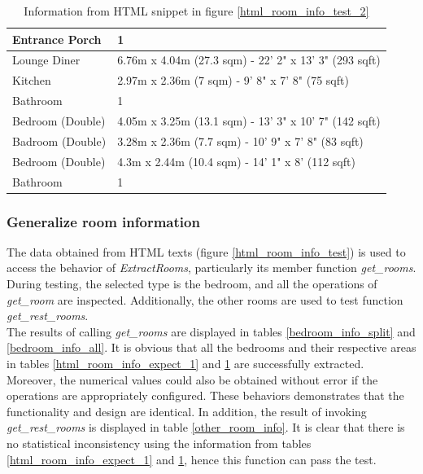 \documentclass[12pt,twoside]{report}
\begin{document}
\begin{table}[!htbp]
	\centering
	\caption{Information from HTML snippet in figure \ref*{html_room_info_test_2}}
	\begin{tabular} {| l | l |}
		\hline
		Entrance Porch & 1\\
		\hline
		Lounge Diner & 6.76m x 4.04m (27.3 sqm) - 22' 2" x 13' 3" (293 sqft)\\
		\hline
		Kitchen & 2.97m x 2.36m (7 sqm) - 9' 8" x 7' 8" (75 sqft)\\
		\hline
		Bathroom & 1\\
		\hline
		Bedroom (Double) & 4.05m x 3.25m (13.1 sqm) - 13' 3" x 10' 7" (142 sqft)\\
		\hline 
		Badroom (Double) & 3.28m x 2.36m (7.7 sqm) - 10' 9" x 7' 8" (83 sqft)\\
		\hline
		Bedroom (Double) & 4.3m x 2.44m (10.4 sqm) - 14' 1" x 8' (112 sqft)\\
		\hline
		Bathroom & 1\\
		\hline
	\end{tabular}
	\label{html_room_info_expect_2}
\end{table}

\subsubsection{Generalize room information}
The data obtained from HTML texts (figure \ref{html_room_info_test}) is used to access the behavior of \textit{ExtractRooms}, particularly its member function \textit{get\_rooms}. During testing, the selected type is the bedroom, and all the operations of \textit{get\_room} are inspected. Additionally, the other rooms are used to test function \textit{get\_rest\_rooms}. 
\\

The results of calling \textit{get\_rooms} are displayed in tables \ref{bedroom_info_split} and \ref{bedroom_info_all}. It is obvious that all the bedrooms and their respective areas in tables \ref{html_room_info_expect_1} and \ref{html_room_info_expect_2} are successfully extracted. Moreover, the numerical values could also be obtained without error if the operations are appropriately configured. These behaviors demonstrates that the functionality and design are identical. In addition, the result of invoking \textit{get\_rest\_rooms} is displayed in table \ref{other_room_info}. It is clear that there is no statistical inconsistency using the information from tables \ref{html_room_info_expect_1} and \ref{html_room_info_expect_2}, hence this function can pass the test. 
\end{document}
